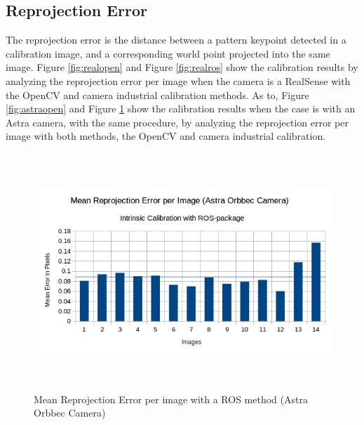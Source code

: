 \subsection{Reprojection Error}

The reprojection error is the distance between a pattern keypoint detected in a calibration image, and a corresponding world point projected into the same image. Figure \ref{fig:realopen} and Figure \ref{fig:realros} show the calibration results by analyzing the reprojection error per image when the camera is a RealSense with the OpenCV and camera \textunderscore industrial calibration methods. As to, Figure \ref{fig:astraopen} and Figure \ref{fig:astraros} show the calibration results when the case is with an Astra camera, with the same procedure, by analyzing the reprojection error per image with both methods, the OpenCV and camera \textunderscore industrial calibration.
\begin{figure}[!h]
\begin{center}
\includegraphics[width=5in, height=3.5in]{figures05/ros_int_cal_astra.png}
\caption{Mean Reprojection Error per image with a ROS method (Astra Orbbec Camera)}%
\label{fig:astraros}
\end{center}
\end{figure}

